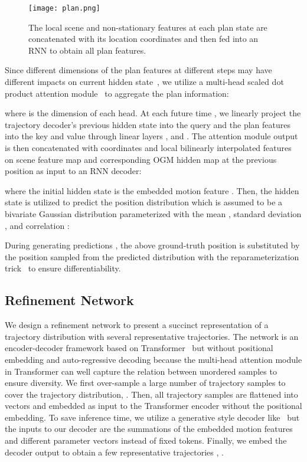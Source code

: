 \documentclass[10pt,twocolumn,letterpaper]{article}
\begin{document}
\begin{figure}[!h]
	\centering
	\texttt{[image: plan.png]}
	\vspace{-0.2cm}

	\caption{The local scene and non-stationary features at each plan state are concatenated with its location coordinates and then fed into an RNN to obtain all plan features.}

	\label{fig:plan}
\end{figure}

 Since different dimensions of the plan features at different steps may have different impacts on current hidden state~\cite{mercat2020multi}, we utilize a multi-head scaled dot product attention module~\cite{vaswani2017attention} to aggregate the plan information:

where  is the dimension of each head. At each future time , we linearly project the trajectory decoder's previous hidden state  into the query  and the plan features into the key  and value  through linear layers ,  and . The attention module output  is then concatenated with coordinates and local bilinearly interpolated features on scene feature map and corresponding OGM hidden map at the previous position  as input to an RNN decoder:

where the initial hidden state  is the embedded motion feature . Then, the hidden state  is utilized to predict the position  distribution which is assumed to be a bivariate Gaussian distribution parameterized with the mean , standard deviation , and correlation :

During generating predictions , the above ground-truth position  is substituted by the position  sampled from the predicted distribution with the reparameterization trick~\cite{Kingma2014Auto} to ensure differentiability.

\subsection{Refinement Network}

We design a refinement network to present a succinct representation of a trajectory distribution with several representative trajectories. The network is an encoder-decoder framework based on Transformer~\cite{vaswani2017attention} but without positional embedding and auto-regressive decoding because the multi-head attention module in Transformer can well capture the relation between unordered samples to ensure diversity. We first over-sample a large number of trajectory samples  to cover the trajectory distribution, \eg . Then, all trajectory samples are flattened into vectors and embedded as input to the Transformer encoder without the positional embedding. To save inference time, we utilize a generative style decoder like~\cite{zhou2021informer} but the inputs to our decoder are the summations of the embedded motion features and  different parameter vectors instead of fixed tokens. Finally, we embed the decoder output to obtain a few representative trajectories , \eg . 
\end{document}
